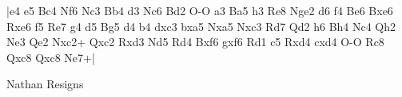 \makegametitle

|e4 e5 Bc4 Nf6 Nc3 Bb4 d3 Nc6 Bd2 O-O a3 Ba5 h3 Re8 Nge2 d6 f4 Be6 Bxe6 Rxe6 f5 Re7 g4 d5 Bg5 d4 b4 dxc3 bxa5 Nxa5 Nxc3 Rd7 Qd2 h6 Bh4 Nc4 Qh2 Ne3 Qe2 Nxc2+ Qxc2 Rxd3 Nd5 Rd4 Bxf6 gxf6 Rd1 c5 Rxd4 cxd4 O-O Rc8 Qxc8 Qxc8 Ne7+| 

\showboard

Nathan Resigns

